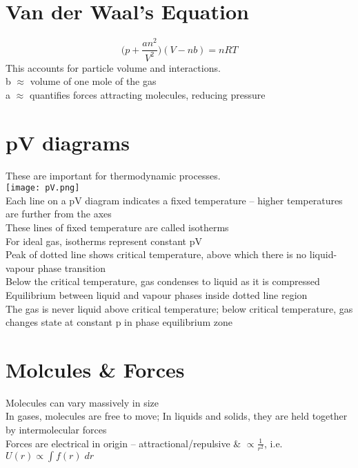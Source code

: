 \documentclass[a4paper, 11pt, fleqn, normalem]{report}
\begin{document}
\section{Van der Waal's Equation}
\vspace{-22pt}
\begin{equation*}
	\Big(p+\frac{an^{2}}{V^{2}}\Big)(V-nb) = nRT
\end{equation*}
This accounts for particle volume and interactions. \\
b $\approx$ volume of one mole of the gas \\
a $\approx$ quantifies forces attracting molecules, reducing pressure

\section{pV diagrams}
These are important for thermodynamic processes. \\
\texttt{[image: pV.png]} \\
Each line on a pV diagram indicates a fixed temperature -- higher temperatures are further from the axes \\
These lines of fixed temperature are called isotherms \\
For ideal gas, isotherms represent constant pV \\
Peak of dotted line shows critical temperature, above which there is no liquid-vapour phase transition \\
Below the critical temperature, gas condenses to liquid as it is compressed \\
Equilibrium between liquid and vapour phases inside dotted line region \\
The gas is never liquid above critical temperature; below critical temperature, gas changes state at constant p in phase equilibrium zone

\section{Molcules \& Forces}
Molecules can vary massively in size \\
In gases, molecules are free to move; In liquids and solids, they are held together by intermolecular forces \\
Forces are electrical in origin -- attractional/repulsive \& $\propto \frac{1}{r^{2}}$, i.e. $U(r)\propto\int\! f(r)\; dr$
\end{document}
